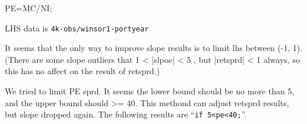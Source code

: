 

\usepackage[T1]{fontenc}




\thispagestyle{fancy}

\newcommand{\code}{\texttt}
\newcommand*{\Commonpath}{20190528}


PE=MC/NI;

LHS data is \code{4k-obs/winsor1-portyear}

It seems that the only way to improve slope results is to limit lhs between (-1, 1). (There are some slope outliers that 1 < |slpoe| < 5 , but |retsprd| < 1 always, so this has no affect on the result of retsprd.)




We tried to limit PE sprd. It seems the lower bound should be no more than 5, and the upper bound should >= 40. This methond can adjust retsprd results, but slope dropped again. The following results are ``\code{if 5<pe<40;}''.






